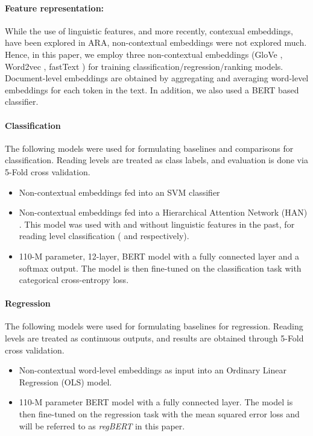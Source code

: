 \documentclass[11pt]{article}
\begin{document}
\paragraph{Feature representation: } While the use of linguistic features, and more recently, contexual embeddings, have been explored in ARA, non-contextual embeddings were not explored much. Hence, in this paper, we employ three non-contextual embeddings (GloVe \cite{Pennington.Socher.ea-14}, Word2vec \cite{mikolov2013efficient}, fastText \cite{Bojanoswki.Grave.ea-17}) for training classification/regression/ranking models.  Document-level embeddings are obtained by aggregating and averaging word-level embeddings for each token in the text. In addition, we also used a BERT \cite{devlin2018bert} based classifier.

\paragraph{Classification}
The following models were used for formulating baselines and comparisons for classification. Reading levels are treated as class labels, and evaluation is done via 5-Fold cross validation.  
\begin{itemize}
    \item Non-contextual embeddings fed into an SVM \cite{Boser.Guyon.ea-92} classifier 
    \item Non-contextual embeddings fed into a Hierarchical Attention Network (HAN) \cite{yang2016hierarchical}. This model was used with and without linguistic features in the past, for reading level classification ( and  respectively).  
    \item 110-M parameter, 12-layer, BERT model with a fully connected layer and a softmax output. The model is then fine-tuned on the classification task with categorical cross-entropy loss.
\end{itemize}
 
\paragraph{Regression}
The following models were used for formulating baselines for regression. Reading levels are treated as continuous outputs, and results are obtained through 5-Fold cross validation. 
\begin{itemize}
    \item Non-contextual word-level embeddings as input into an Ordinary Linear Regression (OLS) model. 
    \item 110-M parameter  BERT  model with a fully connected layer.  The model is then fine-tuned on the regression task with the mean squared error loss and will be referred to as \textit{regBERT} in this paper. 
\end{itemize}
\end{document}
